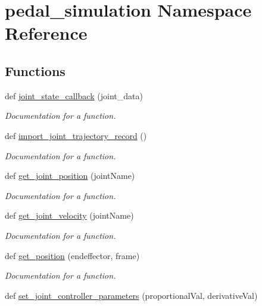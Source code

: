 \hypertarget{namespacepedal__simulation}{}\section{pedal\+\_\+simulation Namespace Reference}
\label{namespacepedal__simulation}
\subsection*{Functions}
\begin{DoxyCompactItemize}
\item 
def \mbox{\hyperlink{namespacepedal__simulation_abcbd2cbc12a595407ec7924c64bf81e5}{joint\+\_\+state\+\_\+callback}} (joint\+\_\+data)
\begin{DoxyCompactList}\small\item\em Documentation for a function. \end{DoxyCompactList}\item 
def \mbox{\hyperlink{namespacepedal__simulation_aa7b4aac4e7d8adad70c76b583c0f24c7}{import\+\_\+joint\+\_\+trajectory\+\_\+record}} ()
\begin{DoxyCompactList}\small\item\em Documentation for a function. \end{DoxyCompactList}\item 
def \mbox{\hyperlink{namespacepedal__simulation_a112986645ceebe46e20e3cf46f16671e}{get\+\_\+joint\+\_\+position}} (joint\+Name)
\begin{DoxyCompactList}\small\item\em Documentation for a function. \end{DoxyCompactList}\item 
def \mbox{\hyperlink{namespacepedal__simulation_af79c2f95fafc2b7a446b98f5dd471d34}{get\+\_\+joint\+\_\+velocity}} (joint\+Name)
\begin{DoxyCompactList}\small\item\em Documentation for a function. \end{DoxyCompactList}\item 
def \mbox{\hyperlink{namespacepedal__simulation_a26318b42c557e0218d81282fe1868e6e}{get\+\_\+position}} (endeffector, frame)
\begin{DoxyCompactList}\small\item\em Documentation for a function. \end{DoxyCompactList}\item 
def \mbox{\hyperlink{namespacepedal__simulation_a0274d42f1436a50698c77d0aa0631318}{set\+\_\+joint\+\_\+controller\+\_\+parameters}} (proportional\+Val, derivative\+Val)

\end{DoxyCompactItemize}
